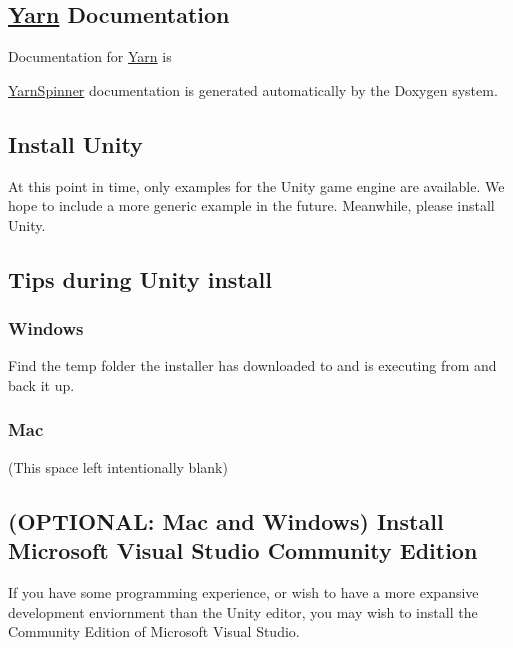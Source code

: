 \subsection*{\hyperlink{a00031}{Yarn} Documentation}

Documentation for \hyperlink{a00031}{Yarn} is

\hyperlink{a00313}{Yarn\-Spinner} documentation is generated automatically by the Doxygen system.

\subsection*{Install Unity}

At this point in time, only examples for the Unity game engine are available. We hope to include a more generic example in the future. Meanwhile, please install Unity.

\subsection*{Tips during Unity install}

\subsubsection*{Windows}

Find the temp folder the installer has downloaded to and is executing from and back it up.

\subsubsection*{Mac}

(This space left intentionally blank)

\subsection*{(O\-P\-T\-I\-O\-N\-A\-L\-: Mac and Windows) Install Microsoft Visual Studio Community Edition}

If you have some programming experience, or wish to have a more expansive development enviornment than the Unity editor, you may wish to install the Community Edition of Microsoft Visual Studio. 